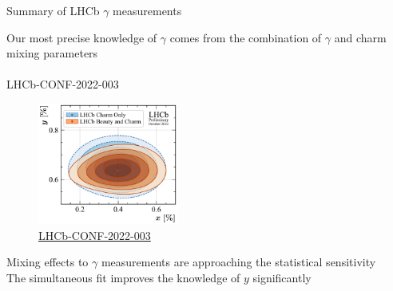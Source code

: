 \documentclass[xcolor={dvipsnames}]{beamer}
\begin{document}
\begin{frame}{Summary of LHCb \texorpdfstring{$\gamma$}{gamma} measurements}
  \begin{center}
    {\Large Our most precise knowledge of $\gamma$ comes from the combination of $\gamma$ and charm mixing parameters}\\~\\
    {\large LHCb-CONF-2022-003}
  \end{center}
  \begin{figure}
    \includegraphics[height=4.0cm]{Plots/gammacharm_lhcb_xD_yD.pdf}
    \vspace{-0.5cm}
    \caption*{\tiny\href{https://lhcbproject.web.cern.ch/Publications/LHCbProjectPublic/LHCb-CONF-2022-003.html}{LHCb-CONF-2022-003}}
  \end{figure}
  \vspace{-0.5cm}
  \begin{center}
    Mixing effects to $\gamma$ measurements are approaching the statistical sensitivity\\
    The simultaneous fit improves the knowledge of $y$ significantly
  \end{center}
\end{frame}
\end{document}
